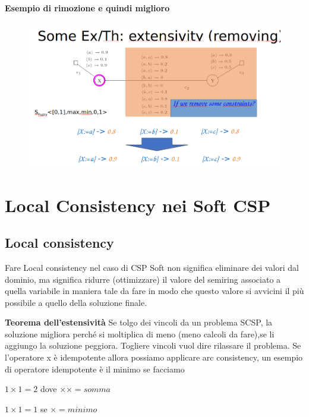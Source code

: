 \subsubsection{Esempio di rimozione e quindi miglioro}
\begin{figure}[htp]
    \centering
    \includegraphics[width=12.5cm, keepaspectratio]{img/Cap4/better2.png}
\end{figure}


\chapter{Local Consistency nei Soft CSP} \label{ch:Local Consistency nei Soft
    CSP}
\section{Local consistency}
Fare Local consistency nel caso di CSP Soft non significa eliminare dei valori
dal dominio, ma significa ridurre (ottimizzare) il valore del semiring associato
a quella variabile in maniera tale da fare in modo che questo valore si avvicini
il più possibile a quello della soluzione finale.

\textbf{Teorema dell'estensività} Se tolgo dei vincoli da un problema SCSP, la
soluzione migliora perché si moltiplica di meno (meno calcoli da fare),se li
aggiungo la soluzione peggiora. Togliere vincoli vuol dire rilassare il
problema. Se l'operatore x è idempotente allora possiamo applicare arc
consistency, un esempio di operatore idempotente è il minimo se facciamo
\begin{center}
    $1 \times 1 = 2$ dove $×\times = somma$
\end{center}
\begin{center}
    $1 \times 1 = 1$ se $\times = minimo$
\end{center}
